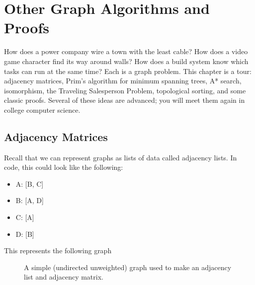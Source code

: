\chapter{Other Graph Algorithms and Proofs}



How does a power company wire a town with the least cable? How does a
video game character find its way around walls? How does a build system
know which tasks can run at the same time? Each is a graph problem. This
chapter is a tour: adjacency matrices, Prim's algorithm for minimum
spanning trees, A* search, isomorphism, the Traveling Salesperson Problem,
topological sorting, and some classic proofs. Several of these ideas are
advanced; you will meet them again in college computer science.
\section{Adjacency Matrices}

Recall that we can represent graphs as lists of data called adjacency lists. In code, this could look like the following:
\begin{itemize}
	\item A: [B, C]
	\item B: [A, D]
	\item C: [A]
	\item D: [B]
\end{itemize}

This represents the following graph
\begin{figure}[H]
	\centering

	\caption{A simple (undirected unweighted) graph used to make an adjacency list and adjacency matrix.}
	\label{fig:adjacency1}
\end{figure}


